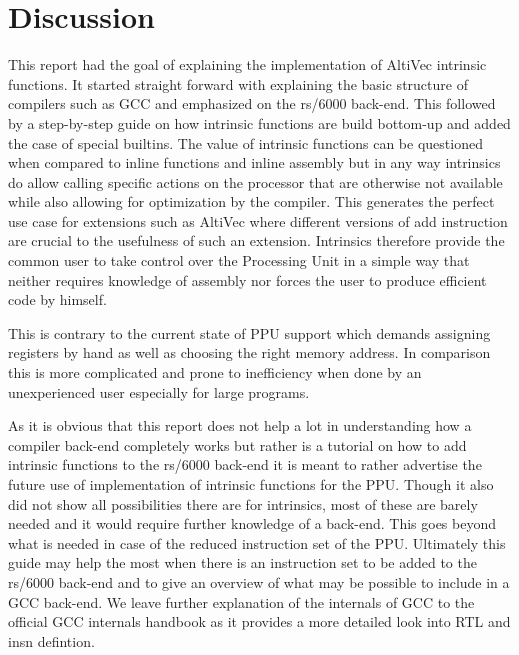 \chapter{Discussion}
\label{chapter:discussion}

This report had the goal of explaining the implementation of AltiVec intrinsic functions. It started straight forward with explaining the basic structure of compilers such as GCC and emphasized on the rs/6000 back-end. This followed by a step-by-step guide on how intrinsic functions are build bottom-up and added the case of special builtins.
The value of intrinsic functions can be questioned when compared to inline functions and inline assembly but in any way intrinsics do allow calling specific actions on the processor that are otherwise not available while also allowing for optimization by the compiler. This generates the perfect use case for extensions such as AltiVec where different versions of add instruction are crucial to the usefulness of such an extension. Intrinsics therefore provide the common user to take control over the Processing Unit in a simple way that neither requires knowledge of assembly nor forces the user to produce efficient code by himself.

This is contrary to the current state of PPU support which demands assigning registers by hand as well as choosing the right memory address. In comparison this is more complicated and prone to inefficiency when done by an unexperienced user especially for large programs.

As it is obvious that this report does not help a lot in understanding how a compiler back-end completely works but rather is a tutorial on how to add intrinsic functions to the rs/6000 back-end it is meant to rather advertise the future use of implementation of intrinsic functions for the PPU. Though it also did not show all possibilities there are for intrinsics, most of these are barely needed and it would require further knowledge of a back-end. This goes beyond what is needed in case of the reduced instruction set of the PPU.
Ultimately this guide may help the most when there is an instruction set to be added to the rs/6000 back-end and to give an overview of what may be possible to include in a GCC back-end.
We leave further explanation of the internals of GCC to the official GCC internals handbook \cite{GCCinternals} as it provides a more detailed look into RTL and insn defintion.
